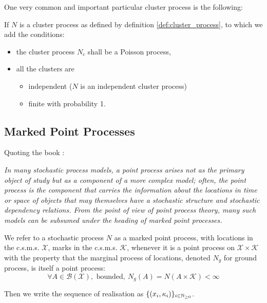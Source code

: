 \documentclass[11pt]{book}
\newcommand{\sequence}[1]{\{ #1 \}_{ i \in \N} }
\begin{document}
One very common and important particular cluster process is the following:
\begin{definition}
\label{def:poisson_cluster}
If $N$ is a cluster process as defined by definition \ref{def:cluster_process}, to which we add the conditions:

\begin{itemize}
\setlength{\itemindent}{2.5 cm}
\item the cluster process $N_c$ shall be a Poisson process,
\item all the clusters are 
\begin{itemize}
\setlength{\itemindent}{3 cm}
\item independent ($N$ is an independent cluster process)
\item finite with probability 1.
\end{itemize}
\end{itemize}

\end{definition}




\newpage
\subsection{Marked Point Processes}
Quoting the book \cite{daley}:

\textit{In many stochastic process models, a point process arises not as the primary object of study but as a component of a more complex model; often, the point process is the component that carries the information about the locations in time or space of objects that may themselves have a stochastic structure and stochastic dependency relations. From the point of view of point process theory, many such models can be subsumed under the heading of marked point processes.}
\begin{definition}
We refer to a stochastic process $N$ as a marked point process, with locations in the c.s.m.s. $\mathcal X$, marks in the c.s.m.s. $\mathcal K$, whenever it is a point process on $\mathcal X \times \mathcal K$ with the property that the marginal process of locations, denoted $N_g$ for ground process, is itself a point process:
\begin{equation} 
\forall A \in \mathcal B ( \mathcal X ), \text{ bounded}, \ N_g ( A ) = N( A \times \mathcal K ) < \infty
\end{equation}

Then we write the sequence of realisation as $ \sequence{ (x_i,\kappa_i) } $.
\end{definition}
\end{document}
